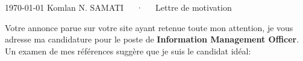 \documentclass[11pt, a4paper]{awesome-cv}
\begin{document}
\makecvheader[R]

\makecvfooter
  {\today}
  {Komlan N. SAMATI~~~·~~~Lettre de motivation}
  {}

\makelettertitle

\begin{cvletter}

Votre annonce parue sur votre site ayant retenue toute mon attention, je vous adresse ma candidature pour le poste de {\bf Information Management Officer}. Un examen de mes références suggère que je suis le candidat idéal:\\

\begin{itemize}


\end{itemize}
\end{cvletter}
\end{document}

